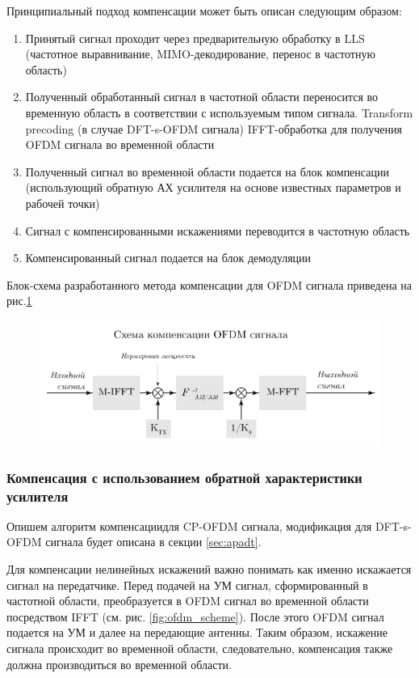 Принципиальный подход компенсации может быть описан следующим
образом:
\begin{enumerate}
    \item Принятый сигнал проходит через предварительную обработку в LLS
    (частотное выравнивание, MIMO-декодирование, перенос в частотную
    область)
    \item Полученный обработанный сигнал в частотной области переносится во
    временную область в соответствии с используемым типом сигнала.
    \subitem Transform precoding (в случае DFT-s-OFDM сигнала)
    \subitem IFFT-обработка для получения OFDM сигнала во временной области
    \item Полученный сигнал во временной области подается на блок
    компенсации (использующий обратную АХ усилителя на основе известных
    параметров и рабочей точки)
    \item Сигнал с компенсированными искажениями переводится в частотную
    область
    \item Компенсированный сигнал подается на блок демодуляции
\end{enumerate}

Блок-схема разработанного метода компенсации для OFDM сигнала приведена на
рис.\ref{fig:ofdm_compensation_scheme}

\begin{figure}[h!]
    \centering
    \includegraphics[width=0.99\linewidth]{figs/ofdm_compensation_scheme.pdf}
    \caption{}
    \label{fig:ofdm_compensation_scheme}
\end{figure}

\subsubsection{Компенсация с использованием обратной характеристики усилителя}
Опишем алгоритм компенсациидля CP-OFDM сигнала,
модификация для DFT-s-OFDM сигнала будет описана в секции \ref{sec:apadt}.

Для компенсации нелинейных искажений важно понимать как именно искажается
сигнал на передатчике. Перед подачей на УМ сигнал, сформированный в
частотной области, преобразуется в OFDM сигнал во временной области
посредством IFFT (см. рис. \ref{fig:ofdm_scheme}). После этого OFDM сигнал
подается на УМ и далее на передающие антенны. Таким образом, искажение
сигнала происходит во временной области, следовательно, компенсация также
должна производиться во временной области. 

